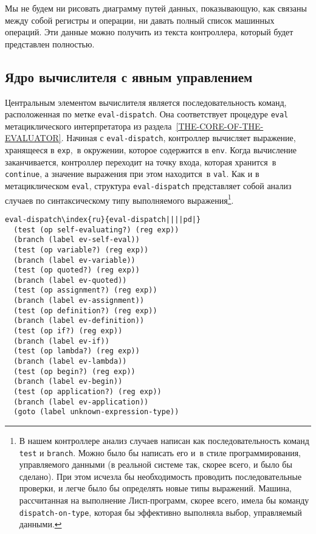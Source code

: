 Мы не будем ни рисовать диаграмму путей данных,
показывающую, как связаны между собой регистры и операции,
ни давать полный список машинных операций.  Эти данные можно получить
из текста контроллера, который будет представлен полностью.

\subsection{Ядро вычислителя с явным управлением}
\label{THE-CORE-OF-THE-EXPLICIT-CONTROL-EVALUATOR}


Центральным элементом вычислителя является
последовательность команд, расположенная по метке
{\tt eval-dispatch}.  Она соответствует процедуре
{\tt eval} метациклического интерпретатора из 
раздела~\ref{THE-CORE-OF-THE-EVALUATOR}.  Начиная с
{\tt eval-dis\-patch}, контроллер вычисляет выражение, хранящееся
в {\tt exp},~в окружении, которое содержится в
{\tt env}.  Когда вычисление заканчивается, контроллер
переходит на точку входа, которая хранится~в {\tt continue},
а значение выражения при этом находится~в {\tt val}.  Как и
в метациклическом {\tt eval}, структура
{\tt eval-dispatch} представляет собой анализ случаев по
синтаксическому типу выполняемого выражения\footnote{В нашем контроллере анализ случаев написан как
последовательность команд {\tt test} и {\tt branch}.
Можно было бы написать его и~в стиле программирования, управляемого
данными (в реальной системе так, скорее всего, и было бы сделано). При
этом исчезла бы необходимость проводить последовательные проверки, и
легче было бы определять новые типы выражений.  Машина, рассчитанная
на выполнение Лисп-программ, скорее всего, имела бы команду
{\tt dispatch-on-type}, которая бы эффективно выполняла выбор,
управляемый данными.
}.

\begin{Verbatim}[fontsize=\small]
eval-dispatch\index{ru}{eval-dispatch||||pd|}
  (test (op self-evaluating?) (reg exp))
  (branch (label ev-self-eval))
  (test (op variable?) (reg exp))
  (branch (label ev-variable))
  (test (op quoted?) (reg exp))
  (branch (label ev-quoted))
  (test (op assignment?) (reg exp))
  (branch (label ev-assignment))
  (test (op definition?) (reg exp))
  (branch (label ev-definition))
  (test (op if?) (reg exp))
  (branch (label ev-if))
  (test (op lambda?) (reg exp))
  (branch (label ev-lambda))
  (test (op begin?) (reg exp))
  (branch (label ev-begin))
  (test (op application?) (reg exp))
  (branch (label ev-application))
  (goto (label unknown-expression-type))
\end{Verbatim}

